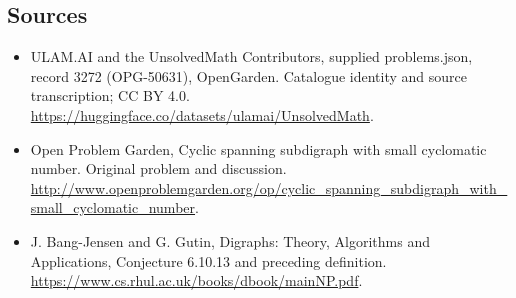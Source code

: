 \documentclass[11pt,a4paper]{article}
\begin{document}
\subsection{Sources}
\begin{itemize}
\item[S1] ULAM.AI and the UnsolvedMath Contributors, supplied problems.json, record 3272 (OPG-50631), OpenGarden. Catalogue identity and source transcription; CC BY 4.0.
\url{https://huggingface.co/datasets/ulamai/UnsolvedMath}.
\item[S2] Open Problem Garden, Cyclic spanning subdigraph with small cyclomatic number. Original problem and discussion.
\url{http://www.openproblemgarden.org/op/cyclic_spanning_subdigraph_with_small_cyclomatic_number}.
\item[S3] J. Bang-Jensen and G. Gutin, Digraphs: Theory, Algorithms and Applications, Conjecture 6.10.13 and preceding definition.
\url{https://www.cs.rhul.ac.uk/books/dbook/mainNP.pdf}.
\end{itemize}
\end{document}

